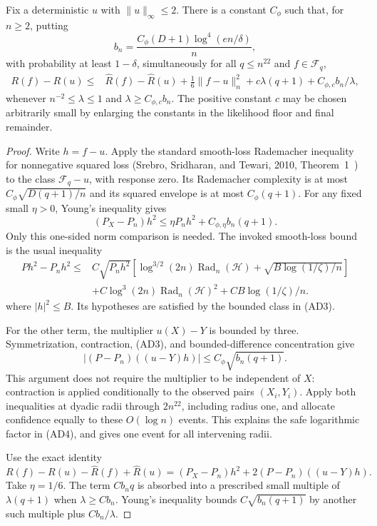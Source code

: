 \begin{lemma}
\label{lem:all-d-relative}
Fix a deterministic $u$ with $\|u\|_\infty\le2$. There is a constant
$C_\phi$ such that, for $n\ge2$, putting
\[
 b_n=\frac{C_\phi(D+1)\log^4(e n/\delta)}n,              \tag{AD4}
\]
with probability at least $1-\delta$, simultaneously for all
$q\le n^{22}$ and $f\in\mathcal F_q$,
\begin{align}
 R(f)-R(u)\le{}&\widehat R(f)-\widehat R(u)
 +\tfrac16\|f-u\|_n^2+c\lambda(q+1)+C_{\phi,c}b_n/\lambda,
                                                                  \tag{AD5}
\end{align}
whenever $n^{-2}\le\lambda\le1$ and $\lambda\ge C_{\phi,c}b_n$.
The positive constant $c$ may be chosen arbitrarily small by enlarging
the constants in the likelihood floor and final remainder.
\end{lemma}
\begin{proof}
Write $h=f-u$. Apply the standard smooth-loss Rademacher inequality
for nonnegative squared loss (Srebro, Sridharan, and Tewari, 2010,
Theorem~1~\cite{sst}) to the class
$\mathcal F_q-u$, with response zero. Its Rademacher complexity is
at most $C_\phi\sqrt{D(q+1)/n}$ and its squared envelope is at most
$C_\phi(q+1)$. For any fixed small $\eta>0$, Young's inequality gives
\[
 (P_X-P_n)h^2\le\eta P_nh^2+C_{\phi,\eta}b_n(q+1).      \tag{AD6}
\]
Only this one-sided norm comparison is needed. The invoked smooth-loss
bound is the usual inequality
\begin{align*}
 P h^2-P_nh^2\le{}&C\sqrt{P_nh^2}
 \left[\log^{3/2}(2n)\operatorname{Rad}_n(\mathcal H)
       +\sqrt{B\log(1/\zeta)/n}\right]\\
 &+C\log^3(2n)\operatorname{Rad}_n(\mathcal H)^2
 +CB\log(1/\zeta)/n.
\end{align*}
where $|h|^2\le B$. Its hypotheses are satisfied by the bounded class
in (AD3).

For the other term, the multiplier $u(X)-Y$ is bounded by three.
Symmetrization, contraction, (AD3), and bounded-difference concentration
give
\[
 |(P-P_n)((u-Y)h)|\le C_\phi\sqrt{b_n(q+1)}.             \tag{AD7}
\]
This argument does not require the multiplier to be independent of $X$:
contraction is applied conditionally to the observed pairs $(X_i,Y_i)$.
Apply both inequalities at dyadic radii through $2n^{22}$, including
radius one, and allocate confidence equally to these $O(\log n)$
events. This explains the safe logarithmic factor in (AD4), and gives
one event for all intervening radii.

Use the exact identity
\[
 R(f)-R(u)-\widehat R(f)+\widehat R(u)
 =(P_X-P_n)h^2+2(P-P_n)((u-Y)h).
\]
Take $\eta=1/6$. The term $C b_nq$ is absorbed into a prescribed
small multiple of $\lambda(q+1)$ when $\lambda\ge Cb_n$.
Young's inequality bounds $C\sqrt{b_n(q+1)}$ by another such multiple
plus $C b_n/\lambda$.
\end{proof}

